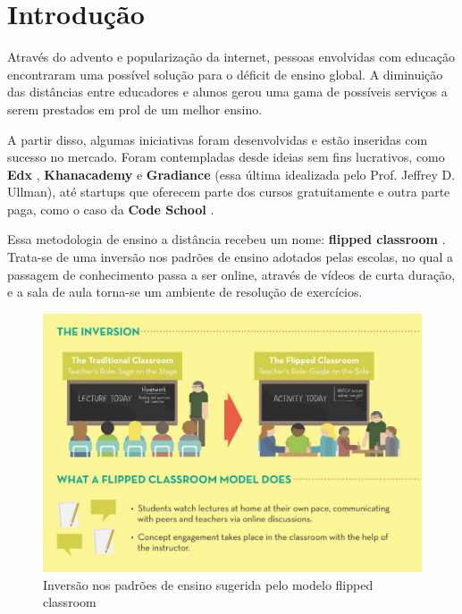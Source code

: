 \documentclass[graduacao,brazil]{ThesisPUC}
\begin{document}

\chapter{Introdu\c{c}\~{a}o}

Atrav\'{e}s do advento e populariza\c{c}\~{a}o da internet, pessoas envolvidas com educa\c{c}\~{a}o
encontraram uma poss\'{i}vel solu\c{c}\~{a}o para o d\'{e}ficit de ensino global. A diminui\c{c}\~{a}o
das dist\^{a}ncias entre educadores e alunos gerou uma gama de poss\'{i}veis servi\c{c}os a serem prestados
em prol de um melhor ensino.

A partir disso, algumas iniciativas foram desenvolvidas e est\~{a}o inseridas com sucesso no
mercado. Foram contempladas desde ideias sem fins lucrativos, como \textbf{Edx} \cite{edx}, 
\textbf{Khanacademy} \cite{khanacademy} e \textbf{Gradiance} \cite{gradiance} (essa \'{u}ltima idealizada 
pelo Prof. Jeffrey D. Ullman), at\'{e} startups que oferecem parte dos cursos gratuitamente e outra 
parte paga, como o caso da \textbf{Code School} \cite{codeschool}.

Essa metodologia de ensino a dist\^{a}ncia recebeu um nome: \textbf{flipped classroom} \cite{FlippedLearning}.
Trata-se de uma invers\~{a}o nos padr\~{o}es de ensino adotados pelas escolas, no qual a passagem de
conhecimento passa a ser online, atrav\'{e}s de v\'{i}deos de curta dura\c{c}\~{a}o, e a sala de aula torna-se
um ambiente de resolu\c{c}\~{a}o de exerc\'{i}cios.

\begin{figure}[H]
    \centering
    \includegraphics[width=\linewidth]{Imagens/flipped_classroom.png}
    \caption{Invers\~{a}o nos padr\~{o}es de ensino sugerida pelo modelo flipped classroom}
\end{figure}
\end{document}
